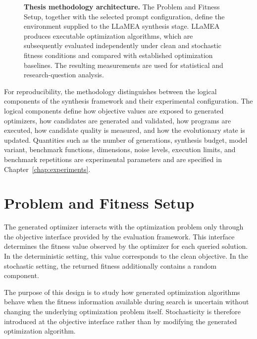 \begin{figure}[htbp]
    \centering
    \resizebox{\textwidth}{!}{%
        
    }
    \caption[Thesis methodology architecture]{\textbf{Thesis methodology architecture.} The Problem and Fitness Setup, together with the selected prompt
    configuration, define the environment supplied to the LLaMEA synthesis
    stage. LLaMEA produces executable optimization algorithms, which are
    subsequently evaluated independently under clean and stochastic fitness
    conditions and compared with established optimization baselines. The
    resulting measurements are used for statistical and research-question
    analysis.}
    \label{fig:methodology_architecture}
\end{figure}

For reproducibility, the methodology distinguishes between the logical
components of the synthesis framework and their experimental configuration.
The logical components define how objective values are exposed to generated
optimizers, how candidates are generated and validated, how programs are
executed, how candidate quality is measured, and how the evolutionary state
is updated. Quantities such as the number of generations, synthesis budget,
model variant, benchmark functions, dimensions, noise levels, execution
limits, and benchmark repetitions are experimental parameters and are
specified in Chapter~\ref{chap:experiments}.


\section{Problem and Fitness Setup}
\label{sec:problem_evaluation_setup}

The generated optimizer interacts with the optimization problem only through
the objective interface provided by the evaluation framework. This interface
determines the fitness value observed by the optimizer for each queried
solution. In the deterministic setting, this value corresponds to the clean
objective. In the stochastic setting, the returned fitness additionally
contains a random component.

The purpose of this design is to study how generated optimization algorithms
behave when the fitness information available during search is uncertain
without changing the underlying optimization problem itself. Stochasticity is
therefore introduced at the objective interface rather than by modifying the
generated optimization algorithm.


